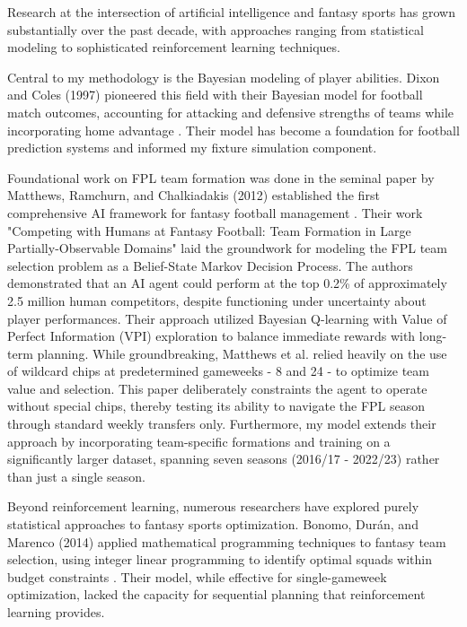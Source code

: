 Research at the intersection of artificial intelligence and fantasy sports has grown substantially over the past decade, with approaches ranging from statistical modeling to sophisticated reinforcement learning techniques.

Central to my methodology is the Bayesian modeling of player abilities. Dixon and Coles (1997) pioneered this field with their Bayesian model for football match outcomes, accounting for attacking and defensive strengths of teams while incorporating home advantage \cite{dixon1997}. Their model has become a foundation for football prediction systems and informed my fixture simulation component.

Foundational work on FPL team formation was done in the seminal paper by Matthews, Ramchurn, and Chalkiadakis (2012) established the first comprehensive AI framework for fantasy football management \cite{matthews2012}. Their work "Competing with Humans at Fantasy Football: Team Formation in Large Partially-Observable Domains" laid the groundwork for modeling the FPL team selection problem as a Belief-State Markov Decision Process. The authors demonstrated that an AI agent could perform at the top 0.2\% of approximately 2.5 million human competitors, despite functioning under uncertainty about player performances. Their approach utilized Bayesian Q-learning with Value of Perfect Information (VPI) exploration to balance immediate rewards with long-term planning. While groundbreaking, Matthews et al. relied heavily on the use of wildcard chips at predetermined gameweeks - 8 and 24 - to optimize team value and selection. This paper deliberately constraints the agent to operate without special chips, thereby testing its ability to navigate the FPL season through standard weekly transfers only. Furthermore, my model extends their approach by incorporating team-specific formations and training on a significantly larger dataset, spanning seven seasons (2016/17 - 2022/23) rather than just a single season.

Beyond reinforcement learning, numerous researchers have explored purely statistical approaches to fantasy sports optimization. Bonomo, Durán, and Marenco (2014) applied mathematical programming techniques to fantasy team selection, using integer linear programming to identify optimal squads within budget constraints \cite{bonomo2014}. Their model, while effective for single-gameweek optimization, lacked the capacity for sequential planning that reinforcement learning provides.